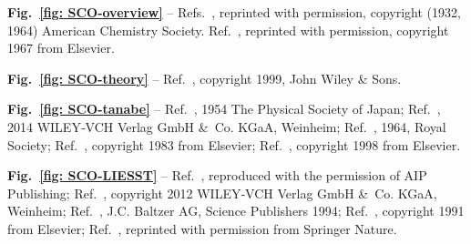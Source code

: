%
%
%
%
%
%

\bigskip \noindent
\textbf{Fig.~\ref{fig: SCO-overview}} --
Refs.~\cite{Pauling1932a, Baker1964},
reprinted with permission, copyright (1932, 1964) American Chemistry Society.
Ref.~\cite{Dezsi1967}, reprinted with permission,
copyright \textsuperscript{\textcopyright{}} 1967 from Elsevier.

\bigskip \noindent
\textbf{Fig.~\ref{fig: SCO-theory}} --
Ref.~\cite{FiggisBook},
copyright \textsuperscript{\textcopyright{}} 1999, John Wiley \& Sons.

\bigskip \noindent
\textbf{Fig.~\ref{fig: SCO-tanabe}} --
Ref.~\cite{Tanabe1954b},
\textsuperscript{\textcopyright{}} 1954 The Physical Society of Japan;
Ref.~\cite{Marino2014},
\textsuperscript{\textcopyright{}} 2014 WILEY‐VCH Verlag GmbH \&~Co. KGaA, Weinheim;
Ref.~\cite{Ewald1964}, \textsuperscript{\textcopyright{}} 1964, Royal Society;
Ref.~\cite{Zimmermann1983},
copyright \textsuperscript{\textcopyright{}} 1983 from Elsevier;
Ref.~\cite{Ksenofontov1998},
copyright \textsuperscript{\textcopyright{}} 1998 from Elsevier.

\bigskip \noindent
\textbf{Fig.~\ref{fig: SCO-LIESST}} --
Ref.~\cite{Hauser1991a}, reproduced with the permission of AIP Publishing;
Ref.~\cite{Gutlich2012},
copyright \textsuperscript{\textcopyright{}} 2012 WILEY‐VCH Verlag GmbH \&~Co. KGaA, Weinheim;
Ref.~\cite{Deisenroth1994},
\textsuperscript{\textcopyright{}} J.C. Baltzer AG, Science Publishers 1994;
Ref.~\cite{Hauser1991c}, copyright \textsuperscript{\textcopyright{}} 1991 from Elsevier;
Ref.~\cite{Hauser2017}, reprinted with permission from Springer Nature.

